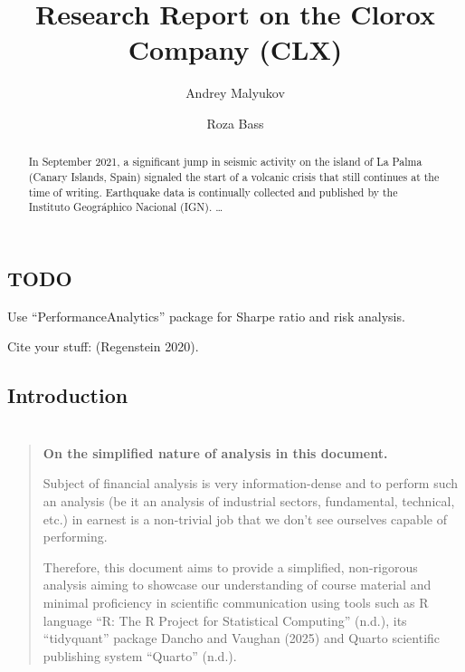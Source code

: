 \documentclass[
  letterpaper,
  DIV=11,
  numbers=noendperiod]{scrartcl}
\title{Research Report on the Clorox Company (CLX)}
\author{Andrey Malyukov \and Roza Bass}
\date{}
\renewcommand*\contentsname{Table of contents}
\newcommand\contentsname{Table of contents}
\begin{document}
\maketitle
\begin{abstract}
In September 2021, a significant jump in seismic activity on the island
of La Palma (Canary Islands, Spain) signaled the start of a volcanic
crisis that still continues at the time of writing. Earthquake data is
continually collected and published by the Instituto Geográphico
Nacional (IGN). \ldots{}
\end{abstract}

\renewcommand*\contentsname{Table of contents}
{
\hypersetup{linkcolor=}
\setcounter{tocdepth}{3}
\tableofcontents
}

\subsection{TODO}\label{todo}

Use ``PerformanceAnalytics'' package for Sharpe ratio and risk analysis.

Cite your stuff: (Regenstein 2020).

\subsection{Introduction}\label{introduction}

\section{}\label{section}

\begin{quote}
\textbf{On the simplified nature of analysis in this document.}

Subject of financial analysis is very information-dense and to perform
such an analysis (be it an analysis of industrial sectors, fundamental,
technical, etc.) in earnest is a non-trivial job that we don't see
ourselves capable of performing.

Therefore, this document aims to provide a simplified, non-rigorous
analysis aiming to showcase our understanding of course material and
minimal proficiency in scientific communication using tools such as R
language {``R: {The R Project} for {Statistical Computing}''} (n.d.),
its ``tidyquant'' package Dancho and Vaughan (2025) and Quarto
scientific publishing system {``Quarto''} (n.d.).
\end{quote}
\end{document}
